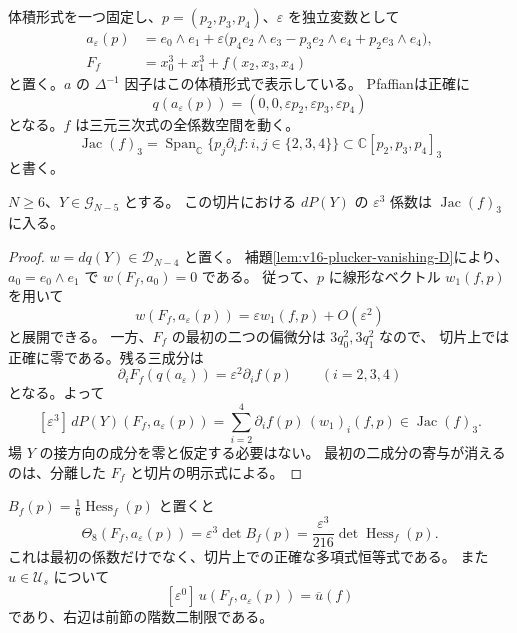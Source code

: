 体積形式を一つ固定し、$p=(p_2,p_3,p_4)$、$\varepsilon$ を独立変数として
\begin{equation}\label{eq:v16-normal-slice}
 \begin{split}
 a_\varepsilon(p)&=e_0\wedge e_1+
 \varepsilon\bigl(p_4e_2\wedge e_3-p_3e_2\wedge e_4+p_2e_3\wedge e_4\bigr),\\
 F_f&=x_0^3+x_1^3+f(x_2,x_3,x_4)
 \end{split}
\end{equation}
と置く。$a$ の $\Delta^{-1}$ 因子はこの体積形式で表示している。
Pfaffianは正確に
\begin{equation}\label{eq:v16-normal-pfaffian}
 q(a_\varepsilon(p))=(0,0,\varepsilon p_2,\varepsilon p_3,\varepsilon p_4)
\end{equation}
となる。$f$ は三元三次式の全係数空間を動く。
\[
 \operatorname{Jac}(f)_3
 =\operatorname{Span}_{\mathbb C}
 \{p_j\partial_i f: i,j\in\{2,3,4\}\}
 \subset\mathbb C[p_2,p_3,p_4]_3
\]
と書く。

\begin{lemma}[通常接触像の横断三次項]
\label{lem:v16-contact-normal-cubic-jet}
$N\ge6$、$Y\in\mathcal G_{N-5}$ とする。
この切片における $dP(Y)$ の $\varepsilon^3$ 係数は
$\operatorname{Jac}(f)_3$ に入る。
\end{lemma}

\begin{proof}
$w=dq(Y)\in\mathcal D_{N-4}$ と置く。
補題\ref{lem:v16-plucker-vanishing-D}により、
$a_0=e_0\wedge e_1$ で $w(F_f,a_0)=0$ である。
従って、$p$ に線形なベクトル $w_1(f,p)$ を用いて
\[
 w(F_f,a_\varepsilon(p))=\varepsilon w_1(f,p)+O(\varepsilon^2)
\]
と展開できる。
一方、$F_f$ の最初の二つの偏微分は $3q_0^2,3q_1^2$ なので、
切片上では正確に零である。残る三成分は
\[
 \partial_iF_f(q(a_\varepsilon))=\varepsilon^2\partial_i f(p)
 \qquad(i=2,3,4)
\]
となる。よって
\[
 [\varepsilon^3]\,dP(Y)(F_f,a_\varepsilon(p))
   =\sum_{i=2}^4\partial_i f(p)\,(w_1)_i(f,p)
   \in\operatorname{Jac}(f)_3.
\]
場 $Y$ の接方向の成分を零と仮定する必要はない。
最初の二成分の寄与が消えるのは、分離した $F_f$ と切片の明示式による。
\end{proof}

\begin{lemma}
\label{lem:v16-theta-normal-hessian}
$B_f(p)=\tfrac16\operatorname{Hess}_f(p)$ と置くと
\begin{equation}\label{eq:v16-exact-theta-slice}
 \Theta_8(F_f,a_\varepsilon(p))
   =\varepsilon^3\det B_f(p)
   =\frac{\varepsilon^3}{216}\det\operatorname{Hess}_f(p).
\end{equation}
これは最初の係数だけでなく、切片上での正確な多項式恒等式である。
また $u\in\mathcal U_s$ について
\[
 [\varepsilon^0]\,u(F_f,a_\varepsilon(p))=\overline u(f)
\]
であり、右辺は前節の階数二制限である。
\end{lemma}

